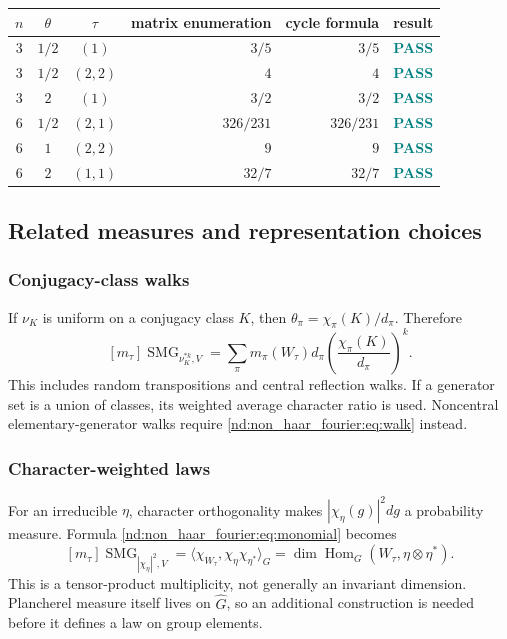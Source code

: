 \documentclass[10pt]{article}
\newcommand{\SMG}{\operatorname{SMG}}
\newcommand{\MGF}{\SMG}
\newcommand{\Hom}{\operatorname{Hom}}
\begin{document}
\begin{center}
\begin{tabular}{@{}cccrrc@{}}
\toprule
$n$ & $\theta$ & $\tau$ & matrix enumeration & cycle formula & result\\
\midrule
3 & $1/2$ & $(1)$ & $3/5$ & $3/5$ & \textcolor{teal}{\textbf{PASS}}\\
3 & $1/2$ & $(2,2)$ & $4$ & $4$ & \textcolor{teal}{\textbf{PASS}}\\
3 & $2$ & $(1)$ & $3/2$ & $3/2$ & \textcolor{teal}{\textbf{PASS}}\\
6 & $1/2$ & $(2,1)$ & $326/231$ & $326/231$ & \textcolor{teal}{\textbf{PASS}}\\
6 & $1$ & $(2,2)$ & $9$ & $9$ & \textcolor{teal}{\textbf{PASS}}\\
6 & $2$ & $(1,1)$ & $32/7$ & $32/7$ & \textcolor{teal}{\textbf{PASS}}\\
\bottomrule
\end{tabular}
\end{center}

\subsection{Related measures and representation choices}

\subsubsection{Conjugacy-class walks}
If $\nu_K$ is uniform on a conjugacy class $K$, then
$\theta_\pi=\chi_\pi(K)/d_\pi$.  Therefore
\begin{equation}\label{nd:non_haar_fourier:eq:classwalk}
 [m_\tau]\MGF_{\nu_K^{*k},V}
 =\sum_\pi m_\pi(W_\tau)d_\pi
   \left(\frac{\chi_\pi(K)}{d_\pi}\right)^k.
\end{equation}
This includes random transpositions and central reflection walks.  If a
generator set is a union of classes, its weighted average character ratio is
used.  Noncentral elementary-generator walks require \eqref{nd:non_haar_fourier:eq:walk} instead.

\subsubsection{Character-weighted laws}
For an irreducible $\eta$, character orthogonality makes
$|\chi_\eta(g)|^2dg$ a probability measure.  Formula \eqref{nd:non_haar_fourier:eq:monomial}
becomes
\begin{equation}\label{nd:non_haar_fourier:eq:charweighted}
 [m_\tau]\MGF_{|\chi_\eta|^2,V}
 =\langle\chi_{W_\tau},\chi_\eta\chi_{\eta^*}\rangle_G
 =\dim\Hom_G(W_\tau,\eta\otimes\eta^*).
\end{equation}
This is a tensor-product multiplicity, not generally an invariant dimension.
Plancherel measure itself lives on $\widehat G$, so an additional construction
is needed before it defines a law on group elements.
\end{document}
